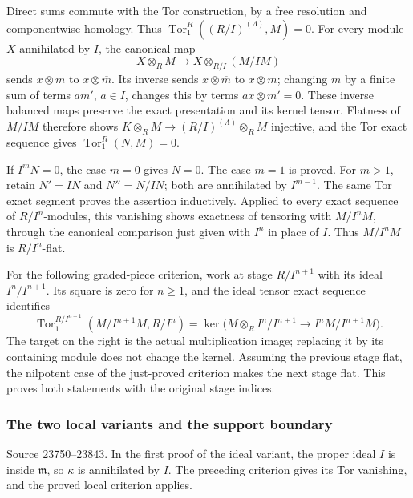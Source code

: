 Direct sums commute with the Tor construction, by a free resolution and componentwise homology. Thus \(\operatorname{Tor}_1^R((R/I)^{(\Lambda)},M)=0\). For every module \(X\) annihilated by \(I\), the canonical map \[
X\otimes_R M\longrightarrow X\otimes_{R/I}(M/IM)
\] sends \(x\otimes m\) to \(x\otimes\overline m\). Its inverse sends \(x\otimes\overline m\) to \(x\otimes m\); changing \(m\) by a finite sum of terms \(am'\), \(a\in I\), changes this by terms \(ax\otimes m'=0\). These inverse balanced maps preserve the exact presentation and its kernel tensor. Flatness of \(M/IM\) therefore shows \(K\otimes_RM\to(R/I)^{(\Lambda)}\otimes_RM\) injective, and the Tor exact sequence gives \(\operatorname{Tor}_1^R(N,M)=0\).

If \(I^mN=0\), the case \(m=0\) gives \(N=0\). The case \(m=1\) is proved. For \(m>1\), retain \(N'=IN\) and \(N''=N/IN\); both are annihilated by \(I^{m-1}\). The same Tor exact segment proves the assertion inductively. Applied to every exact sequence of \(R/I^n\)-modules, this vanishing shows exactness of tensoring with \(M/I^nM\), through the canonical comparison just given with \(I^n\) in place of \(I\). Thus \(M/I^nM\) is \(R/I^n\)-flat.

For the following graded-piece criterion, work at stage \(R/I^{n+1}\) with its ideal \(I^n/I^{n+1}\). Its square is zero for \(n\geq1\), and the ideal tensor exact sequence identifies \[
\operatorname{Tor}_1^{R/I^{n+1}}(M/I^{n+1}M,R/I^n)
 =\ker\bigl(M\otimes_R I^n/I^{n+1}\to I^nM/I^{n+1}M\bigr).
\] The target on the right is the actual multiplication image; replacing it by its containing module does not change the kernel. Assuming the previous stage flat, the nilpotent case of the just-proved criterion makes the next stage flat. This proves both statements with the original stage indices.

\subsubsection{The two local variants and the support boundary}\label{the-two-local-variants-and-the-support-boundary}

Source 23750--23843. In the first proof of the ideal variant, the proper ideal \(I\) is inside \(\mathfrak m\), so \(\kappa\) is annihilated by \(I\). The preceding criterion gives its Tor vanishing, and the proved local criterion applies.

